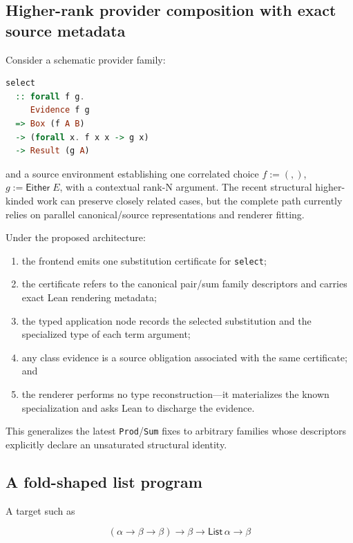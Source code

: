 \documentclass[11pt]{article}
\newcommand{\code}[1]{\texttt{#1}}
\begin{document}
\subsection{Higher-rank provider composition with exact source metadata}

Consider a schematic provider family:

\begin{lstlisting}[language=Haskell]
select
  :: forall f g.
     Evidence f g
  => Box (f A B)
  -> (forall x. f x x -> g x)
  -> Result (g A)
\end{lstlisting}

and a source environment establishing one correlated choice
\(f := (,)\), \(g := \mathsf{Either}\;E\), with a contextual rank-N argument.
The recent structural higher-kinded work can preserve closely related cases,
but the complete path currently relies on parallel canonical/source
representations and renderer fitting.

Under the proposed architecture:

\begin{enumerate}
  \item the frontend emits one substitution certificate for \code{select};
  \item the certificate refers to the canonical pair/sum family descriptors and
    carries exact Lean rendering metadata;
  \item the typed application node records the selected substitution and the
    specialized type of each term argument;
  \item any class evidence is a source obligation associated with the same
    certificate; and
  \item the renderer performs no type reconstruction---it materializes the
    known specialization and asks Lean to discharge the evidence.
\end{enumerate}

This generalizes the latest \code{Prod}/\code{Sum} fixes to arbitrary families
whose descriptors explicitly declare an unsaturated structural identity.

\subsection{A fold-shaped list program}

A target such as

\[
  (\alpha \to \beta \to \beta) \to \beta \to
  \mathsf{List}\,\alpha \to \beta
\]
\end{document}
